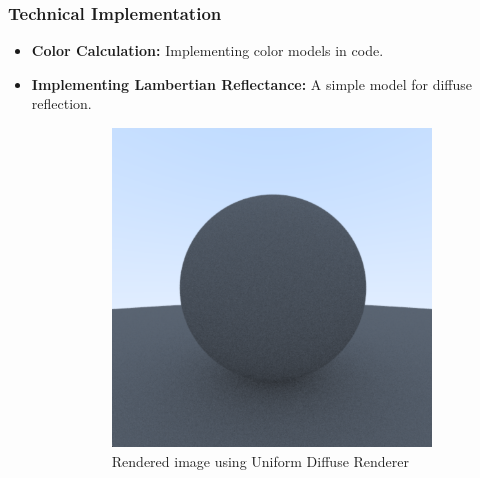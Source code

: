 \documentclass[12pt]{article}
\begin{document}
\subsubsection{Technical Implementation}
\begin{itemize}
    \item \textbf{Color Calculation:} Implementing color models in code.
    \item \textbf{Implementing Lambertian Reflectance:} A simple model for diffuse reflection.
          \begin{figure}[H]
              \centering
              \begin{subfigure}[b]{0.45\textwidth}
                  \centering
                  \includegraphics[width=\textwidth]{images/uniform_diffuse.png}
                  \caption{Rendered image using Uniform Diffuse Renderer}
                  \label{fig:completely_diffuse}
              \end{subfigure}
              \hfill
              \begin{subfigure}[b]{0.45\textwidth}
                  \centering

\end{subfigure}
\end{figure}
\end{itemize}
\end{document}
